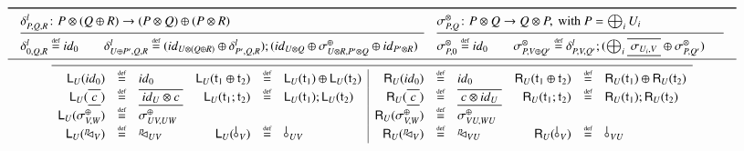 \begin{table}[t]
    \begin{center}
    {
        \hfill {\tiny
  \[\begin{array}{c}
  \toprule
        \def\arraystretch{1.2}
        \begin{array}{cc}
            \begin{array}{@{}l}
                \dl{P}{Q}{R} \colon P \per (Q\piu R)  \to (P \per Q) \piu (P\per R) \vphantom{\symmt{P}{Q}} \\
                \midrule
                \dl{\zero}{Q}{R} \defeq \id{\zero} \vphantom{\symmt{P}{\zero} \defeq \id{\zero}} \qquad
                \dl{U \piu P'}{Q}{R} \defeq (\id{U\per (Q \piu R)} \piu \dl{P'}{Q}{R});(\id{U\per Q} \piu \symmp{U\per R}{P'\per Q} \piu \id{P'\per R}) \vphantom{\symmt{P}{V \piu Q'} \defeq \dl{P}{V}{Q'} ; (\Piu[i]{\tapesymm{U_i}{V}} \piu \symmt{P}{Q'})} \\
            \end{array}
            &
            \begin{array}{@{}l}
                \symmt{P}{Q} \colon P\per Q \to Q \per P, \text{ with } P = \Piu[i]{U_i} \\
                \midrule
                \symmt{P}{\zero} \defeq \id{\zero} \qquad
                \symmt{P}{V \piu Q'} \defeq \dl{P}{V}{Q'} ; (\Piu[i]{\tapesymm{U_i}{V}} \piu \symmt{P}{Q'})
                \phantom{\quad}
            \end{array}
        \end{array}\\
        \midrule
        \begin{array}{rclrcl|rclrcl}
            \midrule
            \LW U {\id\zero} &\defeq& \id\zero& \LW U {\t_1 \piu \t_2} &\defeq& \LW U {\t_1} \piu \LW U {\t_2} &  \RW U {\id\zero} &\defeq& \id\zero & \RW U {\t_1 \piu \t_2} &\defeq& \RW U {\t_1} \piu \RW U {\t_2} \\
            \LW U {\tape{c}} &\defeq& \tape{\id U \per c} &    \LW U {\t_1 ; \t_2} &\defeq& \LW U {\t_1} ; \LW U {\t_2}&  \RW U {\tape{c}} &\defeq& \tape{c \per \id U} & \RW U {\t_1 ; \t_2} &\defeq& \RW U {\t_1} ; \RW U {\t_2} \\
            \LW U {\symmp{V}{W}} &\defeq& \symmp{UV}{UW}       &       && & \RW U {\symmp{V}{W}} &\defeq& \symmp{VU}{WU}&  &&  \\
                        \LW U {\diagp V} &\defeq& \diagp{UV} &  \LW U {\bang V} &\defeq& \bang{UV}& \RW U {\diagp V} &\defeq& \diagp{VU} & \RW U {\bang V} &\defeq& \bang{VU} \\

\end{array}
\end{array}\]}}
\end{center}
\end{table}
